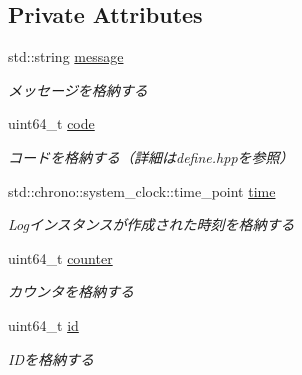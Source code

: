 \subsection*{Private Attributes}
\begin{DoxyCompactItemize}
\item 
\mbox{\label{class_log_a3aedac08a355b8c32542a18df279b1e3}} 
std\+::string \mbox{\hyperlink{class_log_a3aedac08a355b8c32542a18df279b1e3}{message}}
\begin{DoxyCompactList}\small\item\em メッセージを格納する \end{DoxyCompactList}\item 
\mbox{\label{class_log_a6bf473f14c285f20726448ac0e547fd5}} 
uint64\+\_\+t \mbox{\hyperlink{class_log_a6bf473f14c285f20726448ac0e547fd5}{code}}
\begin{DoxyCompactList}\small\item\em コードを格納する（詳細はdefine.\+hppを参照） \end{DoxyCompactList}\item 
\mbox{\label{class_log_aaa2b45e0e3385cc528da461440db8b89}} 
std\+::chrono\+::system\+\_\+clock\+::time\+\_\+point \mbox{\hyperlink{class_log_aaa2b45e0e3385cc528da461440db8b89}{time}}
\begin{DoxyCompactList}\small\item\em Logインスタンスが作成された時刻を格納する \end{DoxyCompactList}\item 
\mbox{\label{class_log_a8820ab7002048d1857b50439625ed6a7}} 
uint64\+\_\+t \mbox{\hyperlink{class_log_a8820ab7002048d1857b50439625ed6a7}{counter}}
\begin{DoxyCompactList}\small\item\em カウンタを格納する \end{DoxyCompactList}\item 
\mbox{\label{class_log_a75367c02e3a2226b169cb8940f711fde}} 
uint64\+\_\+t \mbox{\hyperlink{class_log_a75367c02e3a2226b169cb8940f711fde}{id}}
\begin{DoxyCompactList}\small\item\em I\+Dを格納する \end{DoxyCompactList}\end{DoxyCompactItemize}
